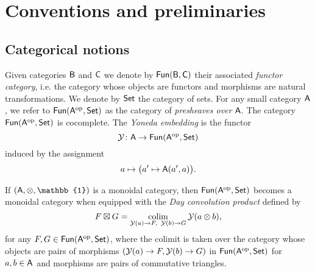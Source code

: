 
\section{Conventions and preliminaries}\label{s:preliminaries}

\subsection{Categorical notions}\label{ss:category theory}
Given categories $\mathsf{B}$ and $\mathsf{C}$ we denote by $\mathsf{Fun}(\mathsf{B}, \mathsf{C})$ their associated \textit{functor category}, i.e. the category whose objects are functors and morphisms are natural transformations. 
We denote by $\mathsf{Set}$ the category of sets.
For any small category $\mathsf{A}$, we refer to $\mathsf{Fun}(\mathsf{A}^{\mathrm{op}}, \mathsf{Set})$ as the category of \textit{presheaves over} $\mathsf{A}$.
The category $\mathsf{Fun}(\mathsf{A}^{\mathrm{op}}, \mathsf{Set})$ is cocomplete.
The \textit{Yoneda embedding} is the functor
\[
\operatorname{\mathcal{Y}} \colon \mathsf{A} \to \mathsf{Fun}(\mathsf{A}^{\mathrm{op}}, \mathsf{Set})
\]
induced by the assignment
\[
a \mapsto \big(a^\prime \mapsto \mathsf{A}(a^\prime, a)\big).
\]

If $(\sA, \otimes, \mathbb{1})$ is a monoidal category, then  $\mathsf{Fun}(\mathsf{A}^{\mathrm{op}}, \mathsf{Set})$ becomes a monoidal category when equipped with the \textit{Day convolution product} defined by
\[ F \boxtimes G = \operatorname*{colim}_{\operatorname{\mathcal{Y}}(a) \to F, \text{ }\operatorname{\mathcal{Y}}(b) \to G} \operatorname{\mathcal{Y}}(a \otimes b),
\]
for any $F,G \in \mathsf{Fun}(\mathsf{A}^{\mathrm{op}}, \mathsf{Set})$, where the colimit is taken over the category whose objects are pairs of morphisms $(\operatorname{\mathcal{Y}}(a) \to F, \operatorname{\mathcal{Y}}(b) \to G)$ in $\mathsf{Fun}(\mathsf{A}^{\mathrm{op}}, \mathsf{Set})$ for $a,b \in \mathsf{A}$ and morphisms are pairs of commutative triangles. 

